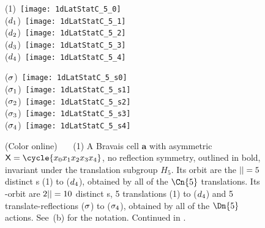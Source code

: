 \begin{figure} \begin{center}
  \begin{minipage}[b]{0.33\textwidth}\begin{center}
{(1)}~\texttt{[image: 1dLatStatC\_5\_0]}
\\
{($d_1$)}~\texttt{[image: 1dLatStatC\_5\_1]}
\\
{($d_2$)}~\texttt{[image: 1dLatStatC\_5\_2]}
\\
{($d_3$)}~\texttt{[image: 1dLatStatC\_5\_3]}
\\
{($d_4$)}~\texttt{[image: 1dLatStatC\_5\_4]}
  \end{center}\end{minipage}
\qquad\quad
  \begin{minipage}[b]{0.33\textwidth}\begin{center}
{($\sigma$)}~\texttt{[image: 1dLatStatC\_5\_s0]}
\\
{($\sigma_1$)}~\texttt{[image: 1dLatStatC\_5\_s1]}
\\
{($\sigma_2$)}~\texttt{[image: 1dLatStatC\_5\_s2]}
\\
{($\sigma_3$)}~\texttt{[image: 1dLatStatC\_5\_s3]}
\\
{($\sigma_4$)}~\texttt{[image: 1dLatStatC\_5\_s4]}

  \end{center} \end{minipage}
  \end{center}
  \caption{\label{fig:1dLatStatC_5}
(Color online)~~~
(1)
A Bravais cell $\mathbf{a}$ with asymmetric
{\lattstate}
\(\Xx=\cycle{\ssp_0 \ssp_1 \ssp_2 \ssp_3 \ssp_4}\),
no reflection symmetry, outlined in bold, invariant under the
translation subgroup $H_{5}$.
Its \Cn{\infty} orbit are the ${||}=5$ distinct {\lattstate}s (1) to
($d_4$), obtained by all of the $\Cn{5}$ translations.
Its \Dn{\infty}-orbit are $2{||}=10$ distinct {\lattstate}s,
5 translations (1) to ($d_4$)
and
5 translate-reflections ($\sigma$) to ($\sigma_4$), obtained by
all of the $\Dn{5}$ actions.
See \,(b) for the notation.
Continued in .
          }
\end{figure}

